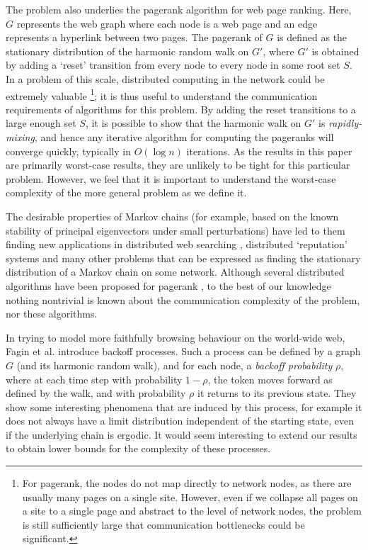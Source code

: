 \documentclass[twocolumn]{article}
\begin{document}
The problem also underlies the pagerank algorithm \cite{page98pagerank} for web page ranking. Here, $G$ represents the web graph where each node is a web page and an edge represents a hyperlink between two pages. The pagerank of $G$ is defined as the stationary distribution of the harmonic random walk on $G'$, where $G'$ is obtained by adding a `reset' transition from every node to every node in some root set $S$. In a problem of this scale, distributed computing in the network could be extremely valuable
\footnote{For pagerank, the nodes do not map directly to network 
nodes, as there are usually many pages on a single site. However, even 
if we collapse all pages on a site to a single page and abstract to the level
of network nodes, the problem is still sufficiently large that communication 
bottlenecks could be significant.}; it is thus useful to understand the communication requirements of algorithms for this problem. By adding the reset transitions to a large enough set $S$, it is possible to show that the harmonic walk on $G'$ is {\em rapidly-mixing}, and hence any iterative algorithm for computing the pageranks will converge quickly, typically in $O(\log n)$ iterations. As the results in this paper are primarily worst-case results, they are unlikely to be tight for this particular problem. However, we feel that it is important to understand the worst-case complexity of the more general problem as we define it.

The desirable properties of Markov chains (for example, based on the known stability of principal eigenvectors under small perturbations) have led to them finding new applications in distributed web searching \cite{wang04vldb,hpdc03pagerank}, distributed `reputation' systems \cite{eigentrust} and many other problems that can be expressed as finding the stationary distribution of a Markov chain on some network. Although several distributed algorithms have been proposed for pagerank \cite{eigentrust,hpdc03pagerank,kamvar03exploiting,page98pagerank,wang04vldb,shi03icpp}, to the best of our knowledge nothing nontrivial is known about the communication complexity of the problem, nor these algorithms.

In trying to model more faithfully browsing behaviour on the world-wide web, Fagin et al. \cite{fagin00} introduce backoff processes. Such a process can be defined by a graph $G$ (and its harmonic random walk), and for each node, a {\em backoff probability} $\rho$, where at each time step with probability $1-\rho$, the token moves forward as defined by the walk, and with probability $\rho$ it returns to its previous state. They show some interesting phenomena that are induced by this process, for example it does not always have a limit distribution independent of the starting state, even if the underlying chain is ergodic. It would seem interesting to extend our results to obtain lower bounds for the complexity of these processes.
\end{document}
